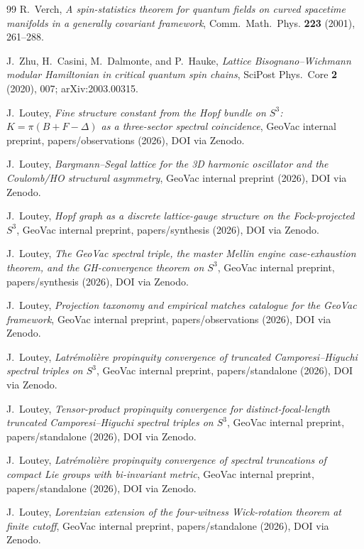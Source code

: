 \documentclass[11pt,a4paper]{article}
\theoremstyle{plain}
\theoremstyle{definition}
\newcommand{\sthree}{S^{3}}
\begin{document}
\begin{thebibliography}{99}
R.~Verch,
\newblock \emph{A spin-statistics theorem for quantum fields on
curved spacetime manifolds in a generally covariant framework},
\newblock Comm.~Math.~Phys. \textbf{223} (2001), 261--288.

J.~Zhu, H.~Casini, M.~Dalmonte, and P.~Hauke,
\newblock \emph{Lattice Bisognano--Wichmann modular Hamiltonian in
critical quantum spin chains},
\newblock SciPost Phys.~Core \textbf{2} (2020), 007;
\newblock arXiv:2003.00315.

J.~Loutey,
\newblock \emph{Fine structure constant from the Hopf bundle on $S^3$:\
$K = \pi(B + F - \Delta)$ as a three-sector spectral coincidence},
\newblock GeoVac internal preprint, papers/observations (2026),
DOI via Zenodo.

J.~Loutey,
\newblock \emph{Bargmann--Segal lattice for the 3D harmonic oscillator
and the Coulomb/HO structural asymmetry},
\newblock GeoVac internal preprint (2026), DOI via Zenodo.

J.~Loutey,
\newblock \emph{Hopf graph as a discrete lattice-gauge structure on
the Fock-projected $S^3$},
\newblock GeoVac internal preprint, papers/synthesis (2026),
DOI via Zenodo.

J.~Loutey,
\newblock \emph{The GeoVac spectral triple, the master Mellin engine
case-exhaustion theorem, and the GH-convergence theorem on $\sthree$},
\newblock GeoVac internal preprint, papers/synthesis (2026),
DOI via Zenodo.

J.~Loutey,
\newblock \emph{Projection taxonomy and empirical matches catalogue
for the GeoVac framework},
\newblock GeoVac internal preprint, papers/observations (2026),
DOI via Zenodo.

J.~Loutey,
\newblock \emph{Latr\'emoli\`ere propinquity convergence of
truncated Camporesi--Higuchi spectral triples on $\sthree$},
\newblock GeoVac internal preprint, papers/standalone (2026),
DOI via Zenodo.

J.~Loutey,
\newblock \emph{Tensor-product propinquity convergence for
distinct-focal-length truncated Camporesi--Higuchi spectral triples
on $\sthree$},
\newblock GeoVac internal preprint, papers/standalone (2026),
DOI via Zenodo.

J.~Loutey,
\newblock \emph{Latr\'emoli\`ere propinquity convergence of spectral
truncations of compact Lie groups with bi-invariant metric},
\newblock GeoVac internal preprint, papers/standalone (2026),
DOI via Zenodo.

J.~Loutey,
\newblock \emph{Lorentzian extension of the four-witness
Wick-rotation theorem at finite cutoff},
\newblock GeoVac internal preprint, papers/standalone (2026),
DOI via Zenodo.

\end{thebibliography}
\end{document}
